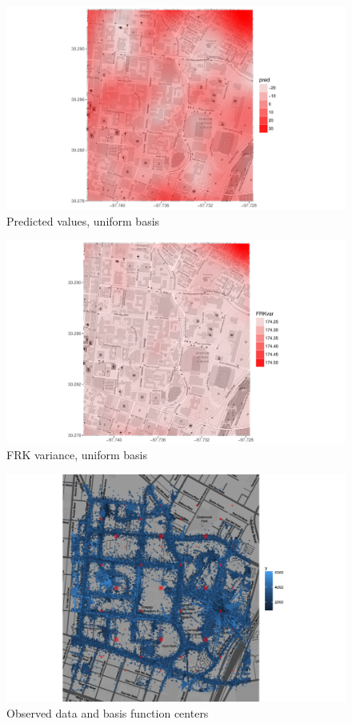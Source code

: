 \documentclass[11pt]{article}
\begin{document}
\begin{figure}[h!]
\centering
\includegraphics[width=160mm,keepaspectratio]{Images/pred.pdf}
\caption{Predicted values, uniform basis \label{fig:4}}
\end{figure}

\begin{figure}[h!]
\centering
\includegraphics[width=160mm,keepaspectratio]{Images/var.pdf}
\caption{FRK variance, uniform basis \label{fig:5}}
\end{figure}

\begin{figure}[h!]
\centering
\includegraphics[width=160mm,keepaspectratio]{Images/data_grid.png}
\caption{Observed data and basis function centers \label{fig:6}}
\end{figure}
\end{document}
